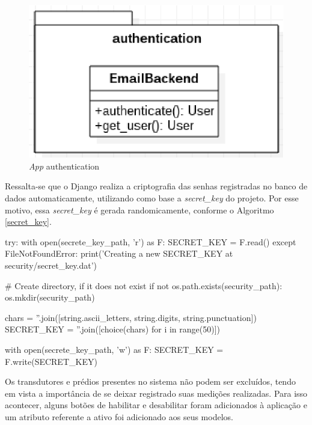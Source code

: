 \begin{figure}[!h]
    \centering
    \includegraphics[keepaspectratio=true,scale=0.8]{figuras/authentication.eps}
    \caption{\textit{App} authentication}
    \label{authentication}
\end{figure}

Ressalta-se que o Django realiza a criptografia das senhas registradas no banco de dados automaticamente, utilizando como base a \textit{secret\_key} do projeto. Por esse motivo, essa \textit{secret\_key} é gerada randomicamente, conforme o Algoritmo \ref{secret_key}.

\begin{python}[caption={Criação automática da \textit{secret\_key} do projeto.}, captionpos=b,label={secret_key}]
try:
    with open(secrete_key_path, 'r') as F:
        SECRET_KEY = F.read()
except FileNotFoundError:
    print('Creating a new SECRET_KEY at security/secret_key.dat')

    # Create directory, if it does not exist
    if not os.path.exists(security_path):
        os.mkdir(security_path)

    chars = ''.join([string.ascii_letters, string.digits, string.punctuation])
    SECRET_KEY = ''.join([choice(chars) for i in range(50)])

    with open(secrete_key_path, 'w') as F:
        SECRET_KEY = F.write(SECRET_KEY)
\end{python}

Os transdutores e prédios presentes no sistema não podem ser excluídos, tendo em vista a importância de se deixar registrado suas medições realizadas. Para isso acontecer, alguns botões de habilitar e desabilitar foram adicionados à aplicação e um atributo referente a ativo foi adicionado aos seus modelos.

